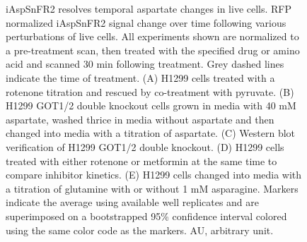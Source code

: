 \documentclass[9pt,lineno]{elife}
\begin{document}
\begin{figure}[ht!]
\centering
{}
\caption{
iAspSnFR2 resolves temporal aspartate changes in live cells.
RFP normalized iAspSnFR2 signal change over time following various perturbations of live cells.
All experiments shown are normalized to a pre-treatment scan, then treated with the specified drug or amino acid and scanned 30 min following treatment.
Grey dashed lines indicate the time of treatment.
(A) H1299 cells treated with a rotenone titration and rescued by co-treatment with pyruvate.
(B) H1299 GOT1/2 double knockout cells grown in media with 40 mM aspartate, washed thrice in media without aspartate and then changed into media with a titration of aspartate.
(C) Western blot verification of H1299 GOT1/2 double knockout.
(D) H1299 cells treated with either rotenone or metformin at the same time to compare inhibitor kinetics.
(E) H1299 cells changed into media with a titration of glutamine with or without 1 mM asparagine.
Markers indicate the average using available well replicates and are superimposed on a bootstrapped 95\% confidence interval colored using the same color code as the markers.
AU, arbitrary unit.
}
\label{fig:Fig2}
\end{figure}
\end{document}
